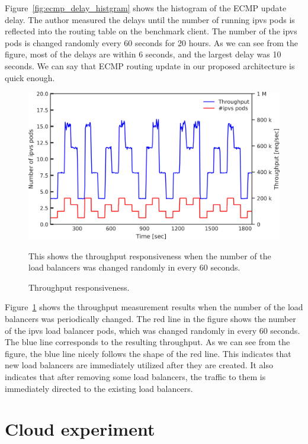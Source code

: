 Figure~\ref{fig:ecmp_delay_histgram} shows the histogram of the ECMP update delay.
The author measured the delays until the number of running ipvs pods is reflected into the routing table on the benchmark client.
The number of the ipvs pods is changed randomly every 60 seconds for 20 hours.
As we can see from the figure, most of the delays are within 6 seconds, and the largest delay was 10 seconds.
We can say that ECMP routing update in our proposed architecture is quick enough.

\begin{figure}[t]
  \includegraphics[width=0.98\columnwidth,left]{Figs/ecmp_response}
  \caption{Throughput responsiveness.}
This shows the throughput responsiveness when the number of the load balancers was changed randomly in every 60 seconds. 
  \label{fig:ecmp_response}
\end{figure}

Figure~\ref{fig:ecmp_response} shows the throughput measurement results when the number of the load balancers was periodically changed. 
The red line in the figure shows the number of the ipvs load balancer pods, which was changed randomly in every 60 seconds.
The blue line corresponds to the resulting throughput.
As we can see from the figure, the blue line nicely follows the shape of the red line.
This indicates that new load balancers are immediately utilized after they are created.
It also indicates that after removing some load balancers, the traffic to them is immediately directed to the existing load balancers.

\FloatBarrier


\section{Cloud experiment
}

